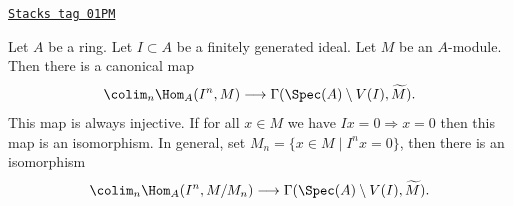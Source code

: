 \begin{lemma}
\label{properties-lemma-sections-over-quasi-compact-open-in-affine}
\href{https://stacks.math.columbia.edu/tag/01PM}{\texttt{Stacks tag 01PM}}

Let $A$ be a ring.
Let $I \subset A$ be a finitely generated ideal.
Let $M$ be an $A$-module.
Then there is a canonical map
$$
\colim_n \Hom_A(I^n, M)
\longrightarrow
\Gamma(\Spec(A) \setminus V(I), \widetilde{M}).
$$
This map is always injective.
If for all $x \in M$ we have $Ix = 0 \Rightarrow x = 0$
then this map is an isomorphism. In general, set
$M_n = \{x \in M \mid I^nx = 0\}$, then there is an
isomorphism
$$
\colim_n \Hom_A(I^n, M/M_n)
\longrightarrow
\Gamma(\Spec(A) \setminus V(I), \widetilde{M}).
$$
\end{lemma}

